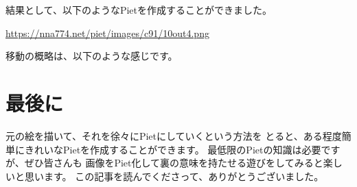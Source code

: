 結果として、以下のようなPietを作成することができました。

\begin{center}
  \url{https://nna774.net/piet/images/c91/10out4.png}
\end{center}

移動の概略は、以下のような感じです。


\section{最後に}

元の絵を描いて、それを徐々にPietにしていくという方法を
とると、ある程度簡単にきれいなPietを作成することができます。
最低限のPietの知識は必要ですが、ぜひ皆さんも
画像をPiet化して裏の意味を持たせる遊びをしてみると楽しいと思います。
この記事を読んでくださって、ありがとうございました。
